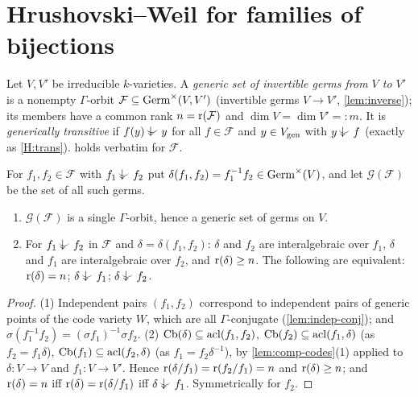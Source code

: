 \section{Hrushovski--Weil for families of bijections}
\label{sec:bij}

Let $V,V'$ be irreducible $k$-varieties.  A \emph{generic set of invertible germs
from $V$ to $V'$} is a nonempty $\Gamma$-orbit $\mathcal F\subseteq\operatorname{Germ}^\times(V,V')$
(invertible germs $V\to V'$, \cref{lem:inverse}); its members have a common rank
$n=\operatorname{r}(\mathcal F)$ and $\dim V=\dim V'=:m$.  It is \emph{generically transitive} if
$f(y)\ind{}y$ for all $f\in\mathcal F$ and $y\in V_{\operatorname{gen}}$ with $y\ind{}f$
(exactly as \ref{H:trans}).   holds verbatim for $\mathcal F$.

\begin{definition}\label{def:diff}
For $f_1,f_2\in\mathcal F$ with $f_1\ind{}f_2$ put $\delta(f_1,f_2)=f_1^{-1}f_2\in\operatorname{Germ}^\times(V)$,
and let $\mathcal G(\mathcal F)$ be the set of all such germs.
\end{definition}

\begin{lemma}\label{lem:diff-basic}
\begin{enumerate}[nosep]
\item $\mathcal G(\mathcal F)$ is a single $\Gamma$-orbit, hence a generic set of germs on $V$.
\item For $f_1\ind{}f_2$ in $\mathcal F$ and $\delta=\delta(f_1,f_2)$: $\delta$ and $f_2$ are
  interalgebraic over $f_1$, $\delta$ and $f_1$ are interalgebraic over $f_2$, and
  $\operatorname{r}(\delta)\ge n$.  The following are equivalent: $\operatorname{r}(\delta)=n$; $\delta\ind{}f_1$;
  $\delta\ind{}f_2$.
\end{enumerate}
\end{lemma}
\begin{proof}
(1) Independent pairs $(f_1,f_2)$ correspond to independent pairs of generic points of
the code variety $W$, which are all $\Gamma$-conjugate (\cref{lem:indep-conj}); and
$\sigma(f_1^{-1}f_2)=(\sigma f_1)^{-1}\sigma f_2$.
(2) $\operatorname{Cb}(\delta)\subseteq\operatorname{acl}(f_1,f_2)$, $\operatorname{Cb}(f_2)\subseteq\operatorname{acl}(f_1,\delta)$ (as $f_2=f_1\delta$),
$\operatorname{Cb}(f_1)\subseteq\operatorname{acl}(f_2,\delta)$ (as $f_1=f_2\delta^{-1}$), by \cref{lem:comp-codes}(1)
applied to $\delta:V\to V$ and $f_1:V\to V'$.  Hence
$\operatorname{r}(\delta/f_1)=\operatorname{r}(f_2/f_1)=n$ and $\operatorname{r}(\delta)\ge n$; and $\operatorname{r}(\delta)=n$ iff
$\operatorname{r}(\delta)=\operatorname{r}(\delta/f_1)$ iff $\delta\ind{}f_1$.  Symmetrically for $f_2$.
\end{proof}

